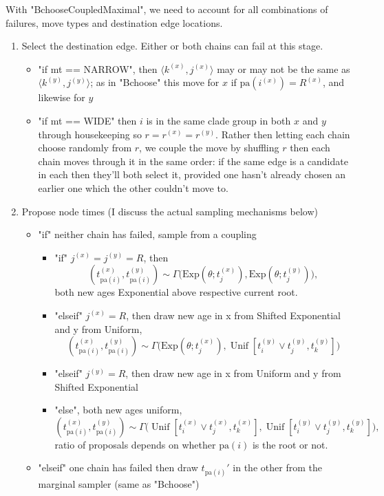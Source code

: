 \documentclass[11pt,a4paper]{article}
\newcommand{\edge}[2]{\langle#1, #2\rangle}
\newcommand{\pa}{\mathrm{pa}}
\newcommand{\Exp}[1]{\mathrm{Exp}(#1)}
\DeclareMathOperator*{\Unif}{\mathrm{Unif}}
\begin{document}
With "BchooseCoupledMaximal", we need to account for all combinations of failures, move types and destination edge locations.
\begin{enumerate}
    \item Select the destination edge. Either or both chains can fail at this stage.
    \begin{itemize}
        \item "if mt == NARROW", then $ \edge{k^{(x)}}{j^{(x)}} $ may or may not be the same as $ \edge{k^{(y)}}{j^{(y)}} $; as in "Bchoose" this move for $ x $ if $ \pa(i^{(x)}) = R^{(x)} $, and likewise for $ y $
        \item "if mt == WIDE" then $ i $ is in the same clade group in both $ x $ and $ y $ through housekeeping so $ r = r^{(x)} = r^{(y)} $. Rather then letting each chain choose randomly from $ r $, we couple the move by shuffling $ r $ then each chain moves through it in the same order: if the same edge is a candidate in each then they'll both select it, provided one hasn't already chosen an earlier one which the other couldn't move to.
    \end{itemize}
    \item Propose node times (I discuss the actual sampling mechanisms below)
    \begin{itemize}
        \item "if" neither chain has failed, sample from a coupling
        \begin{itemize}
            \item "if" $ j^{(x)} = j^{(y)} = R $, then
            \[
                (t_{\pa(i)}^{(x)}, t_{\pa(i)}^{(y)}) \sim \Gamma\big(\Exp{\theta; t_j^{(x)}}, \Exp{\theta; t_j^{(y)}}\big),
            \]
            both new ages Exponential above respective current root.
            \item "elseif" $ j^{(x)} = R $, then draw new age in x from Shifted Exponential and y from Uniform,
            \[
                (t_{\pa(i)}^{(x)}, t_{\pa(i)}^{(y)}) \sim \Gamma\big(\Exp{\theta; t_j^{(x)}}, \Unif[t_i^{(y)} \vee t_j^{(y)}, t_k^{(y)}]\big)
            \]
            \item "elseif" $ j^{(y)} = R $, then draw new age in x from Uniform and y from Shifted Exponential
            \item "else", both new ages uniform,
            \[
                (t_{\pa(i)}^{(x)}, t_{\pa(i)}^{(y)}) \sim \Gamma\big(\Unif[t_i^{(x)} \vee t_j^{(x)}, t_k^{(x)}], \Unif[t_i^{(y)} \vee t_j^{(y)}, t_k^{(y)}]\big),
            \]
            ratio of proposals depends on whether $ \pa(i) $ is the root or not.
        \end{itemize}
        \item "elseif" one chain has failed then draw $ t_{\pa(i)}' $ in the other from the marginal sampler (same as "Bchoose")
    \end{itemize}
\end{enumerate}
\end{document}
